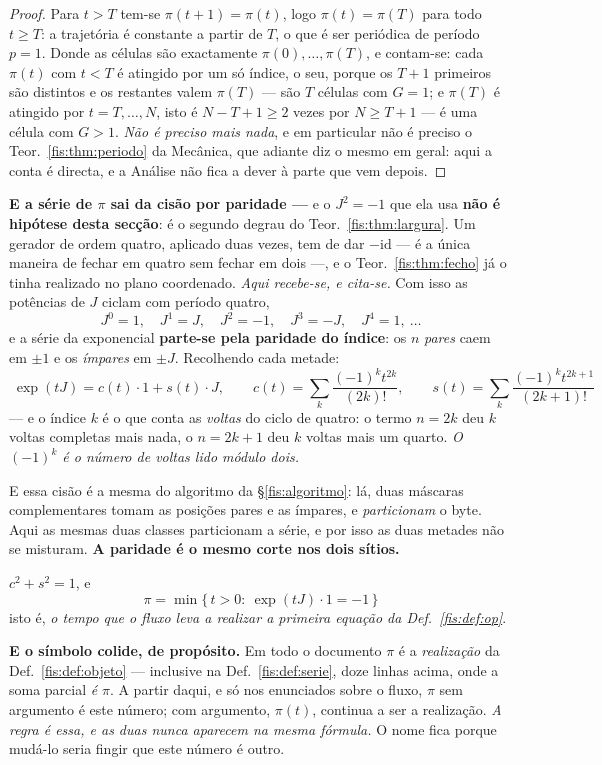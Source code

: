 \documentclass[livro.tex]{subfiles}
\begin{document}
\begin{proof}
Para $t>T$ tem-se $\pi(t+1)=\pi(t)$, logo $\pi(t)=\pi(T)$ para todo $t\ge T$: a
trajetória é constante a partir de $T$, o que é ser periódica de período $p=1$.
Donde as células são exactamente $\pi(0),\dots,\pi(T)$, e contam-se: cada
$\pi(t)$ com $t<T$ é atingido por um só índice, o seu, porque os $T+1$ primeiros
são distintos e os restantes valem $\pi(T)$ --- são $T$ células com $G=1$; e
$\pi(T)$ é atingido por $t=T,\dots,N$, isto é $N-T+1\ge2$ vezes por
$N\ge T+1$ --- é uma célula com $G>1$. \emph{Não é preciso mais nada}, e em
particular não é preciso o Teor.~\ref{fis:thm:periodo} da Mecânica, que adiante
diz o mesmo em geral: aqui a conta é directa, e a Análise não fica a dever à
parte que vem depois.
\end{proof}

\medskip\noindent\textbf{E a série de $\pi$ sai da cisão por paridade ---} e o
$J^{2}=-1$ que ela usa \textbf{não é hipótese desta secção}: é o segundo degrau
do Teor.~\ref{fis:thm:largura}. Um gerador de ordem quatro, aplicado duas vezes,
tem de dar $-\mathrm{id}$ --- é a única maneira de fechar em quatro sem fechar em
dois ---, e o Teor.~\ref{fis:thm:fecho} já o tinha realizado no plano coordenado.
\emph{Aqui recebe-se, e cita-se.} Com isso as potências de $J$ ciclam com período
quatro,
\[
J^{0}=1,\quad J^{1}=J,\quad J^{2}=-1,\quad J^{3}=-J,\quad J^{4}=1,\ \dots
\]
e a série da exponencial \textbf{parte-se pela paridade do índice}: os $n$
\emph{pares} caem em $\pm1$ e os \emph{ímpares} em $\pm J$. Recolhendo cada
metade:
\[
\boxed{\;
\exp(tJ)=c(t)\cdot 1+s(t)\cdot J,\qquad
c(t)=\sum_{k}\frac{(-1)^{k}t^{2k}}{(2k)!},\qquad
s(t)=\sum_{k}\frac{(-1)^{k}t^{2k+1}}{(2k+1)!}\;}
\]
--- e o índice $k$ é o que conta as \emph{voltas} do ciclo de quatro: o termo
$n=2k$ deu $k$ voltas completas mais nada, o $n=2k+1$ deu $k$ voltas mais um
quarto. \emph{O $(-1)^{k}$ é o número de voltas lido módulo dois.}

\medskip\noindent E essa cisão é a mesma do algoritmo da §\ref{fis:algoritmo}:
lá, duas máscaras complementares tomam as posições pares e as ímpares, e
\emph{particionam} o byte. Aqui as mesmas duas classes particionam a série, e por
isso as duas metades não se misturam. \textbf{A paridade é o mesmo corte nos dois
sítios.}

\begin{proposicao}\label{fis:prop:pi}
$c^{2}+s^{2}=1$, e
\[
\boxed{\;\pi=\min\{\,t>0:\ \exp(tJ)\cdot 1=-1\,\}\;}
\]
isto é, \emph{o tempo que o fluxo leva a realizar a primeira equação da
Def.~\ref{fis:def:op}}.

\medskip\noindent\textbf{E o símbolo colide, de propósito.} Em todo o documento
$\pi$ é a \emph{realização} da Def.~\ref{fis:def:objeto} --- inclusive na
Def.~\ref{fis:def:serie}, doze linhas acima, onde a soma parcial \emph{é} $\pi$.
A partir daqui, e só nos enunciados sobre o fluxo, $\pi$ sem argumento é este
número; com argumento, $\pi(t)$, continua a ser a realização. \emph{A regra é
essa, e as duas nunca aparecem na mesma fórmula.} O nome fica porque mudá-lo
seria fingir que este número é outro.
\end{proposicao}
\end{document}
